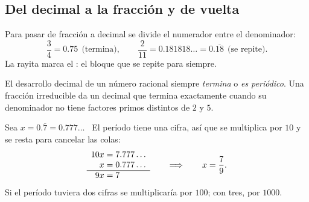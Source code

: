 \documentclass[11pt,a4paper]{article}
\newcommand{\per}[1]{\overline{#1}}
\let\nivelzuka\nivel
\renewcommand{\nivel}[2]{\Needspace{5\baselineskip}\nivelzuka{#1}{#2}}
\begin{document}
\subsection{Del decimal a la fracción y de vuelta}
Para pasar de fracción a decimal se divide el numerador entre el denominador:
\[ \frac34=0.75\ \ \text{(termina)},\qquad \frac{2}{11}=0.181818\ldots=0.\per{18}\ \ \text{(se repite)}. \]
La rayita marca el : el bloque que se repite para siempre.
\begin{propiedad}
El desarrollo decimal de un número racional siempre \emph{termina} o \emph{es periódico}. Una fracción irreducible da un
decimal que termina exactamente cuando su denominador no tiene factores primos distintos de $2$ y $5$.
\end{propiedad}
\begin{ejemplo}
Sea $x=0.\per{7}=0.777\ldots$ \ El período tiene una cifra, así que se multiplica por $10$ y se resta para cancelar las colas:
\[ \begin{array}{r@{\;=\;}l} 10x & 7.777\ldots\\ x & 0.777\ldots\\ \hline 9x & 7 \end{array}
\qquad\Longrightarrow\qquad x=\frac79. \]
Si el período tuviera dos cifras se multiplicaría por $100$; con tres, por $1000$.
\end{ejemplo}
\end{document}
